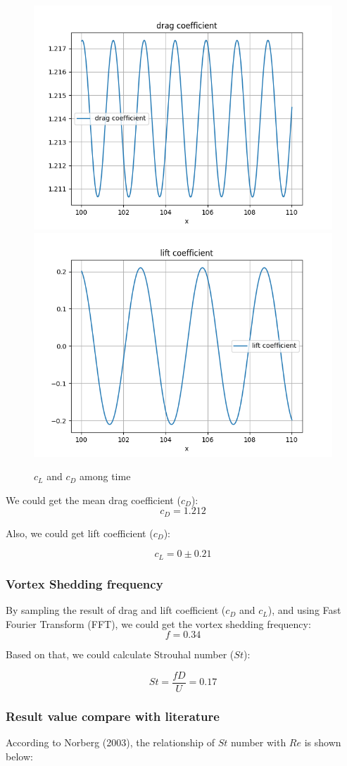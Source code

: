 \documentclass[12pt]{article}
\begin{document}
\begin{figure}[H]
    \centering
    \includegraphics[width=0.45\linewidth]{figure/Analysis/N32_Re150_8x4/cd_N32_Re150_8x4.jpg}
    \includegraphics[width=0.45\linewidth]{figure/Analysis/N32_Re150_8x4/cl_N32_Re150_8x4.jpg}
    \caption{$c_L$ and $c_D$ among time}
\end{figure}


We could get the mean drag coefficient ($c_D$):
$$c_D = 1.212$$

Also, we could get lift coefficient ($c_D$):

$$c_L = 0 \pm 0.21$$


\subsubsection{Vortex Shedding frequency}

By sampling the result of drag and lift coefficient ($c_D$ and $c_L$), and using Fast Fourier Transform (FFT), we could get the vortex shedding frequency:
$$f = 0.34$$

Based on that, we could calculate Strouhal number ($St$):

$$St = \frac{f D}{U} = 0.17 $$


\subsubsection{Result value compare with literature}

According to Norberg (2003)\cite{NORBERG200357}, the relationship of $St$ number with $Re$ is shown below:
\end{document}
